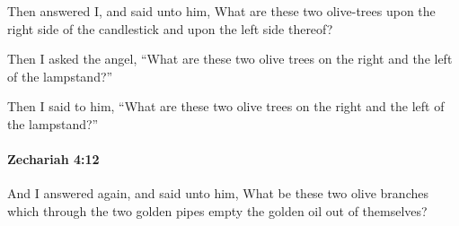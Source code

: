 			\begin{versebox}
					\item[BHS] 
					\item[LXX] 
					\item[ASV] Then answered I, and said unto him, What are these two olive-trees upon the right side of the candlestick and upon the left side thereof?
					\item[NIV] Then I asked the angel, “What are these two olive trees on the right and the left of the lampstand?”
					\item[NRSV] Then I said to him, “What are these two olive trees on the right and the left of the lampstand?”
			\end{versebox}

		\paragraph{Zechariah 4:12} %
			\label{ZECHARIAH-4-12}

			And I answered again, and said unto him, What be these two olive branches which through the two golden pipes empty the golden oil out of themselves?

